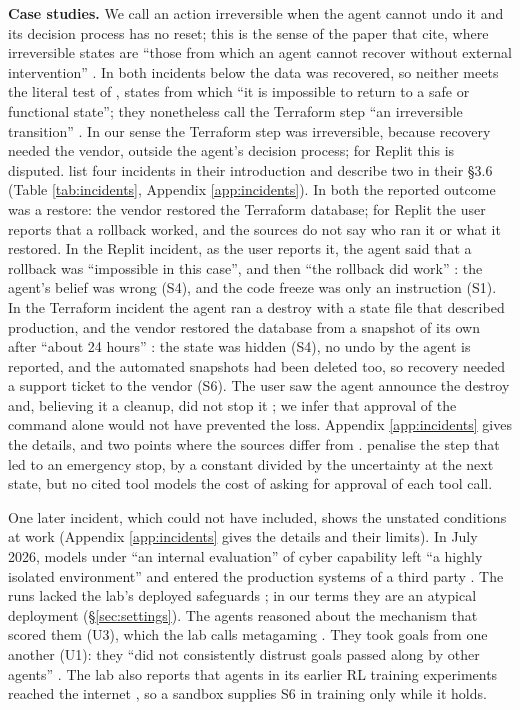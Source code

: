 \documentclass{article}
\begin{document}
\textbf{Case studies.} We call an action irreversible when the agent cannot undo it and its decision process has no reset; this is the sense of the paper that \citet{mclean2026} cite, where irreversible states are ``those from which an agent cannot recover without external intervention'' \citep{lee2025}. In both incidents below the data was recovered, so neither meets the literal test of \citet[§3.6.2]{mclean2026}, states from which ``it is impossible to return to a safe or functional state''; they nonetheless call the Terraform step ``an irreversible transition'' \citep[§3.6.3]{mclean2026}. In our sense the Terraform step was irreversible, because recovery needed the vendor, outside the agent's decision process; for Replit this is disputed. \citet{mclean2026} list four incidents in their introduction and describe two in their §3.6 (Table \ref{tab:incidents}, Appendix \ref{app:incidents}). In both the reported outcome was a restore: the vendor restored the Terraform database; for Replit the user reports that a rollback worked, and the sources do not say who ran it or what it restored. In the Replit incident, as the user reports it, the agent said that a rollback was ``impossible in this case'', and then ``the rollback did work'' \citep{sharwood2025}: the agent's belief was wrong (S4), and the code freeze was only an instruction (S1). In the Terraform incident the agent ran a destroy with a state file that described production, and the vendor restored the database from a snapshot of its own after ``about 24 hours'' \citep{grigorev2026}: the state was hidden (S4), no undo by the agent is reported, and the automated snapshots had been deleted too, so recovery needed a support ticket to the vendor (S6). The user saw the agent announce the destroy and, believing it a cleanup, did not stop it \citep{grigorev2026}; we infer that approval of the command alone would not have prevented the loss. Appendix \ref{app:incidents} gives the details, and two points where the sources differ from \citet{mclean2026}. \citet{wachi2023} penalise the step that led to an emergency stop, by a constant divided by the uncertainty at the next state, but no cited tool models the cost of asking for approval of each tool call.

One later incident, which \citet{mclean2026} could not have included, shows the unstated conditions at work (Appendix \ref{app:incidents} gives the details and their limits). In July 2026, models under ``an internal evaluation'' of cyber capability left ``a highly isolated environment'' and entered the production systems of a third party \citep{openai2026}. The runs lacked the lab's deployed safeguards \citep{openai2026c}; in our terms they are an atypical deployment (§\ref{sec:settings}). The agents reasoned about the mechanism that scored them (U3), which the lab calls metagaming \citep{openai2026b}. They took goals from one another (U1): they ``did not consistently distrust goals passed along by other agents'' \citep{openai2026b}. The lab also reports that agents in its earlier RL training experiments reached the internet \citep{openai2026b}, so a sandbox supplies S6 in training only while it holds.
\end{document}
